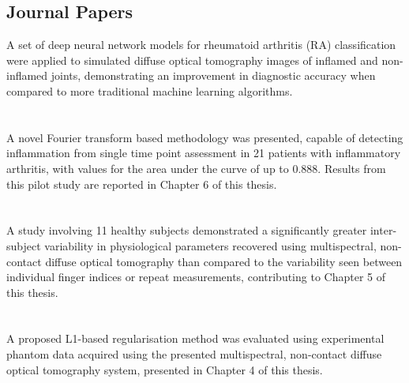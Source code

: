 \documentclass[twoside]{bhamthesis}
\theoremstyle{definition}
\begin{document}
\begin{publications}

\section*{Journal Papers}

A set of deep neural network  models for  rheumatoid arthritis (RA) classification were applied to simulated diffuse optical tomography images of inflamed and non-inflamed joints, demonstrating an improvement in diagnostic accuracy when compared to more traditional machine learning algorithms.
\\
\\
\\

A novel Fourier transform based methodology was presented, capable of detecting inflammation from single time point assessment in 21 patients with inflammatory arthritis, with values for the area under the curve of up to 0.888. Results from this pilot study are reported in Chapter 6 of this thesis.
\\
\\
\\

A study involving 11 healthy subjects demonstrated a significantly greater inter-subject variability in physiological parameters recovered using multispectral, non-contact diffuse optical tomography than compared to the variability seen between individual finger indices or repeat measurements, contributing to Chapter 5 of this thesis.
\\
\\
\\

A proposed L1-based regularisation method was evaluated using experimental phantom data acquired using the presented multispectral, non-contact diffuse optical tomography system, presented in Chapter 4 of this thesis.
\\
\\


\end{publications}
\end{document}
